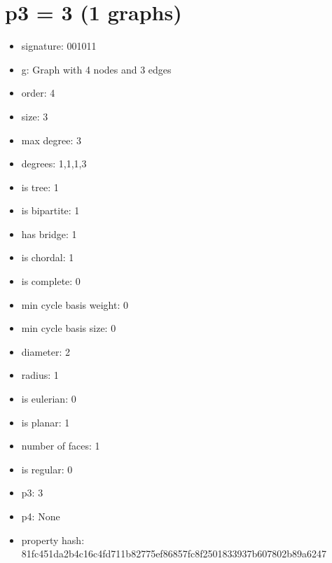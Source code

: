 \chapter{p3 = 3 (1 graphs)}
\newpage\begin{figure}
\end{figure}
\begin{itemize}
\item signature: 001011
\item g: Graph with 4 nodes and 3 edges
\item order: 4
\item size: 3
\item max degree: 3
\item degrees: 1,1,1,3
\item is tree: 1
\item is bipartite: 1
\item has bridge: 1
\item is chordal: 1
\item is complete: 0
\item min cycle basis weight: 0
\item min cycle basis size: 0
\item diameter: 2
\item radius: 1
\item is eulerian: 0
\item is planar: 1
\item number of faces: 1
\item is regular: 0
\item p3: 3
\item p4: None
\item property hash: 81fc451da2b4c16c4fd711b82775ef86857fc8f2501833937b607802b89a6247
\end{itemize}
\newpage
